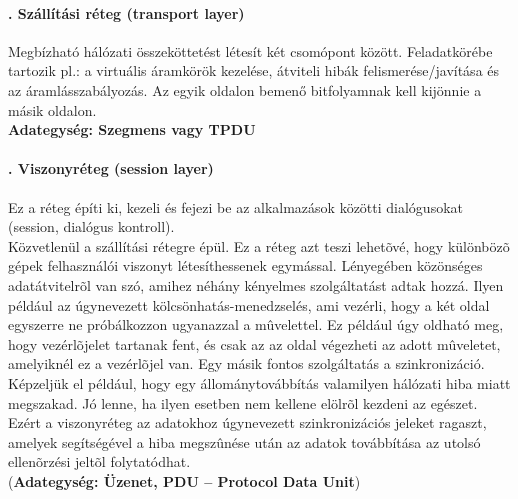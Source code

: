 \paragraph[Szállítási réteg]{. Szállítási réteg (transport layer)}
Megbízható hálózati összeköttetést létesít két csomópont között. Feladatkörébe tartozik pl.: a virtuális áramkörök kezelése, átviteli hibák felismerése/javítása és az áramlásszabályozás. Az egyik oldalon bemenő bitfolyamnak kell kijönnie a másik oldalon.\\
\textbf{Adategység: Szegmens vagy TPDU}
\paragraph[Viszonyréteg]{. Viszonyréteg (session layer)}
Ez a réteg építi ki, kezeli és fejezi be az alkalmazások közötti dialógusokat (session, dialógus kontroll).\\
Közvetlenül a szállítási rétegre épül. Ez a réteg azt teszi lehetõvé, hogy különbözõ gépek felhasználói viszonyt létesíthessenek egymással. Lényegében közönséges adatátvitelrõl van szó, amihez néhány kényelmes szolgáltatást adtak hozzá. Ilyen például az úgynevezett kölcsönhatás-menedzselés, ami vezérli, hogy a két oldal egyszerre ne próbálkozzon ugyanazzal a mûvelettel. Ez például úgy oldható meg, hogy vezérlõjelet tartanak fent, és csak az az oldal végezheti az adott mûveletet, amelyiknél ez a vezérlõjel van. Egy másik fontos szolgáltatás a szinkronizáció. Képzeljük el például, hogy egy állománytovábbítás valamilyen hálózati hiba miatt megszakad. Jó lenne, ha ilyen esetben nem kellene elölrõl kezdeni az egészet. Ezért a viszonyréteg az adatokhoz úgynevezett szinkronizációs jeleket ragaszt, amelyek segítségével a hiba megszûnése után az adatok továbbítása az utolsó ellenõrzési jeltõl folytatódhat.\\
(\textbf{Adategység: Üzenet, PDU -- Protocol Data Unit})

